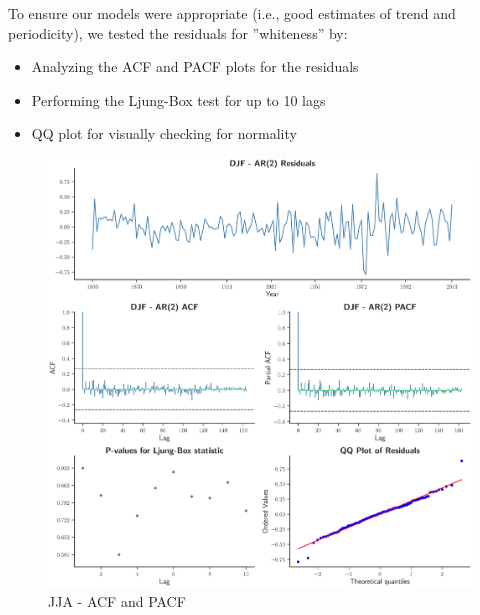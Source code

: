 \documentclass[12pt]{article}
\begin{document}
To ensure our models were appropriate (i.e., good estimates of  trend and periodicity), we tested the residuals for ”whiteness” by:
\begin{itemize}
\item Analyzing the ACF and PACF plots for the residuals
\item Performing the Ljung-Box test for up to 10 lags
\item QQ plot for visually checking for normality
\end{itemize}


\begin{figure}[!htbp]
  \centering
  \includegraphics[width=1\textwidth,center]{figs/djf_res}
  \caption{JJA - ACF and PACF}\label{djf_res}
\end{figure}
\end{document}
